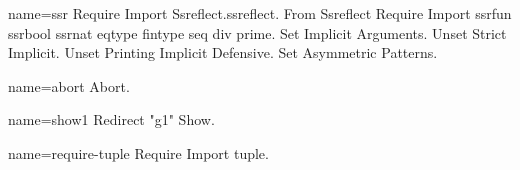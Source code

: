 \begin{coqdef}{name=ssr}
Require Import Ssreflect.ssreflect.
From Ssreflect Require Import ssrfun ssrbool ssrnat eqtype fintype seq div prime.
Set Implicit Arguments.
Unset Strict Implicit.
Unset Printing Implicit Defensive.
Set Asymmetric Patterns.
\end{coqdef}
\begin{coqdef}{name=abort}
Abort.
\end{coqdef}
\begin{coqdef}{name=show1}
Redirect "g1" Show.
\end{coqdef}
\begin{coqdef}{name=require-tuple}
Require Import tuple.
\end{coqdef}

\label{ch:sigmabool}




